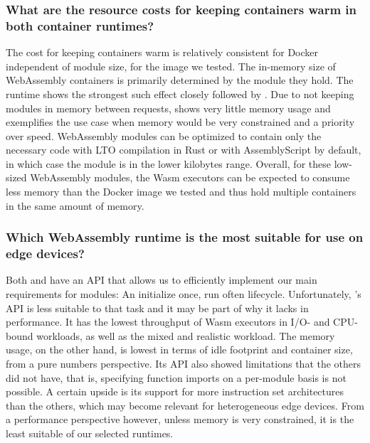 \subsubsection*{What are the resource costs for keeping containers warm in both container runtimes?}

The cost for keeping containers warm is relatively consistent for Docker independent of module size, for the image we tested. The in-memory size of WebAssembly containers is primarily determined by the module they hold. The  runtime shows the strongest such effect closely followed by . Due to not keeping modules in memory between requests,  shows very little memory usage and exemplifies the use case when memory would be very constrained and a priority over speed. WebAssembly modules can be optimized to contain only the necessary code with LTO compilation in Rust or with AssemblyScript by default, in which case the module is in the lower kilobytes range.
Overall, for these low-sized WebAssembly modules, the Wasm executors can be expected to consume less memory than the Docker image we tested and thus hold multiple containers in the same amount of memory.

\subsubsection*{Which WebAssembly runtime is the most suitable for use on edge devices?}

Both  and  have an API that allows us to efficiently implement our main requirements for modules: An initialize once, run often lifecycle. Unfortunately, 's API is less suitable to that task and it may be part of why it lacks in performance. It has the lowest throughput of Wasm executors in I/O- and CPU-bound workloads, as well as the mixed and realistic workload. The memory usage, on the other hand, is lowest in terms of idle footprint and container size, from a pure numbers perspective. Its API also showed limitations that the others did not have, that is, specifying function imports on a per-module basis is not possible. A certain upside is its support for more instruction set architectures than the others, which may become relevant for heterogeneous edge devices. From a performance perspective however, unless memory is very constrained, it is the least suitable of our selected runtimes.

